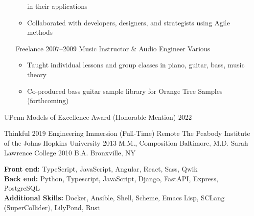 \documentclass{article}
\begin{document}
\begin{itemize}[leftmargin=0em, label={}]
\begin{itemize}[label=*]
            in their applications
          \item \small Collaborated with developers, designers, and strategists
            using Agile methods
        \end{itemize}
    \experience
        {Freelance}
        {2007--2009}
        {Music Instructor \& Audio Engineer}
        {Various}
        \begin{itemize}[label=*]
          \item \small Taught individual lessons and group classes in piano,
            guitar, bass, music theory
          \item \small Co-produced bass guitar sample library for Orange Tree
            Samples (forthcoming)
        \end{itemize}
\end{itemize}


\begin{itemize}[leftmargin=0em, label={}]
  \award
      {UPenn Models of Excellence Award (Honorable Mention)}
      {2022}
\end{itemize}


\begin{itemize}[leftmargin=0em, label={}]
    \experience
        {Thinkful}
        {2019}
        {Engineering Immersion (Full-Time)}
        {Remote}
    \experience
        {The Peabody Institute of the Johns Hopkins University}
        {2013}
        {M.M., Composition}
        {Baltimore, M.D.}
    \experience
        {Sarah Lawrence College}
        {2010}
        {B.A.}
        {Bronxville, NY}
\end{itemize}


\textbf{Front end:} TypeScript, JavaScript, Angular, React, Sass, Qwik \\
\textbf{Back end:} Python, Typescript, JavaScript, Django, FastAPI, Express,
  PostgreSQL \\
\textbf{Additional Skills:} Docker, Ansible, Shell, Scheme, Emacs Lisp, SCLang
  (SuperCollider), LilyPond, Rust
\end{document}
